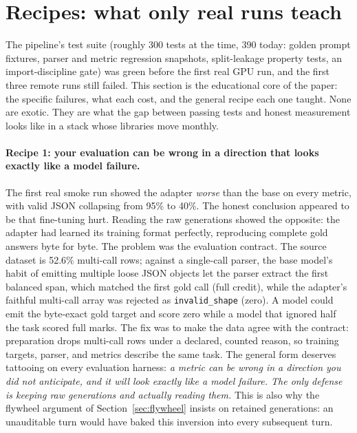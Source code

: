 \documentclass{article}
\begin{document}
\section{Recipes: what only real runs teach}
\label{sec:recipes}

The pipeline's test suite (roughly 300 tests at the time, 390 today: golden prompt fixtures, parser and metric regression snapshots, split-leakage property tests, an import-discipline gate) was green before the first real GPU run, and the first three remote runs still failed. This section is the educational core of the paper: the specific failures, what each cost, and the general recipe each one taught. None are exotic. They are what the gap between passing tests and honest measurement looks like in a stack whose libraries move monthly.

\paragraph{Recipe 1: your evaluation can be wrong in a direction that looks exactly like a model failure.}
The first real smoke run showed the adapter \emph{worse} than the base on every metric, with valid JSON collapsing from 95\% to 40\%. The honest conclusion appeared to be that fine-tuning hurt. Reading the raw generations showed the opposite: the adapter had learned its training format perfectly, reproducing complete gold answers byte for byte. The problem was the evaluation contract. The source dataset is 52.6\% multi-call rows; against a single-call parser, the base model's habit of emitting multiple loose JSON objects let the parser extract the first balanced span, which matched the first gold call (full credit), while the adapter's faithful multi-call array was rejected as \texttt{invalid\_shape} (zero). A model could emit the byte-exact gold target and score zero while a model that ignored half the task scored full marks. The fix was to make the data agree with the contract: preparation drops multi-call rows under a declared, counted reason, so training targets, parser, and metrics describe the same task. The general form deserves tattooing on every evaluation harness: \emph{a metric can be wrong in a direction you did not anticipate, and it will look exactly like a model failure. The only defense is keeping raw generations and actually reading them.} This is also why the flywheel argument of Section~\ref{sec:flywheel} insists on retained generations: an unauditable turn would have baked this inversion into every subsequent turn.
\end{document}
